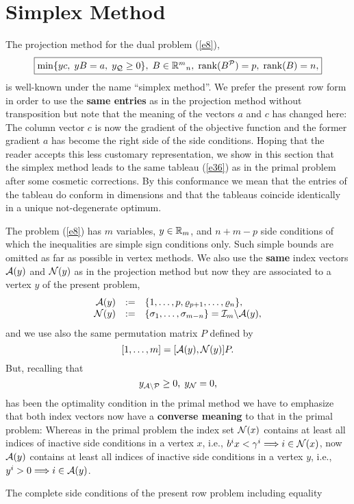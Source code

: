 \section{Simplex Method}
The projection method for the dual problem (\ref{e8}),
\[
\fbox{$
\min \{yc, \; yB = a, \; y_{\Q} \geq 0\}, \;
B \in \Bbb{R}^m{}_n, \; \rank (B^{\P}) = p, \;
\rank (B) = n,
$}
\]
is well-known under the name ``simplex method''.  We prefer the present row
form in order to use the {\bf same entries} as in the projection method without
transposition but note that the meaning of the vectors $a$ and $c$ has changed
here:  The column vector $c$ is now the gradient of the objective function and
the former gradient $a$ has become the right side of the side conditions.
Hoping that the reader accepts this less customary representation, we show in
this section that the simplex method leads to the same tableau (\ref{e36})
as in the primal problem after some cosmetic corrections.  By this conformance
we mean that the entries of the tableau do conform in dimensions and that the
tableaus coincide identically in a unique not-degenerate optimum.
\par
The problem (\ref{e8}) has $m$ variables, $y \in \Bbb{R}_m$, and $n + m- p$
side conditions of which the inequalities are simple sign conditions only.
Such simple bounds are omitted as far as possible in vertex methods.  We also
use the {\bf same} index vectors $\A (y)$ and $\N (y)$ as in the projection
method but now they are associated to a vertex $y$ of the present problem,
%
\begin{equation} \label{e19}
\ba{.}{rcl}
\A(y)  &:=& \{1, \ldots, p,\rho  _{p+1}, \ldots, \rho _n\},\\
\N(y)  &:=& \{\sigma  _1, \ldots, \sigma _{m - n}\}
= \I_m \backslash \A(y),
\ea{.}
\end{equation}
and we use also the same permutation matrix $P$ defined by
\[
[1, \ldots, m] = [\A (y), \N (y)]P.
\]
%
But, recalling that
\[
y_{\A \backslash \P} \geq 0, \; y_{\N} = 0,
\]
has been the optimality condition in the primal method we have to emphasize
that both index vectors now have a {\bf converse meaning} to that in the primal
problem:  Whereas in the primal problem the index set $\N(x)$ contains at least
all indices of inactive side conditions in a vertex $x$, i.e., $b^ix < \gamma
^i \Longrightarrow i \in \N(x)$, now $\A(y)$ contains at least all indices of
inactive side conditions in a vertex $y$, i.e., $y^i > 0 \Longrightarrow i \in
\A(y)$.
\par
%
The complete side conditions of the present row problem including equality
